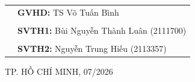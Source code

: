 \documentclass[a4paper]{article}
\theoremstyle{definition}
\begin{document}
\begin{titlepage}
\vspace{0.5cm}

\begin{center}
\begin{tabular}{ll}
\hspace{5cm} &  \textbf{\Large GVHD:} {\Large TS Võ Tuấn Bình} \\
\\[0.2cm]
\hspace{5cm} &  \textbf{\Large SVTH1:} {\Large Bùi Nguyễn Thành Luân (2111700)} \\
\\[0.2cm]
\hspace{5cm} &  \textbf{\Large SVTH2:} {\Large Nguyễn Trung Hiếu (2113357)} \\
\end{tabular}
\end{center}

\vspace{1.5cm}
\begin{center}
{\Large TP. HỒ CHÍ MINH, 07/2026}
\end{center}
\end{titlepage}

\hypersetup{pageanchor=true}
\newpage
\tableofcontents
\newpage


\newpage

\newpage

\newpage

\newpage

\newpage

\newpage

\newpage

\newpage

\newpage

\newpage

\newpage

\newpage

\newpage

\newpage

\end{document}
